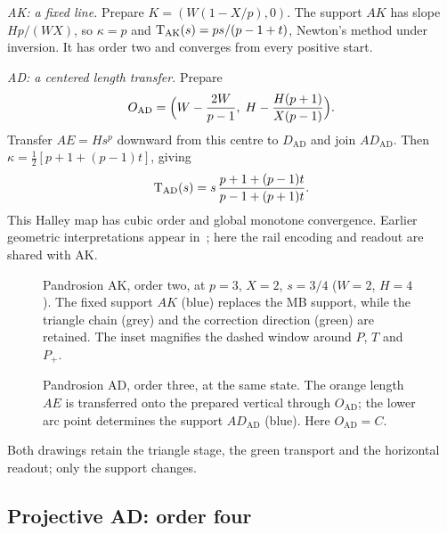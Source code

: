 \emph{AK: a fixed line.} Prepare $K=(W(1-X/p),0)$. The support $AK$ has slope $Hp/(WX)$, so
$\kappa=p$ and $\mathrm{T}_{\mathrm{AK}}(s)=ps/(p-1+t)$, Newton's method under inversion. It has order two and
converges from every positive start.

\emph{AD: a centered length transfer.} Prepare
\[ O_{\mathrm{AD}}=\Bigl(W-\frac{2W}{p-1},\;H-\frac{H(p+1)}{X(p-1)}\Bigr). \]
Transfer $AE=Hs^{p}$ downward from this centre to $D_{\mathrm{AD}}$ and join $AD_{\mathrm{AD}}$. Then
$\kappa=\tfrac12[p+1+(p-1)t]$, giving
\begin{equation}\label{eq:AD}
\mathrm{T}_{\mathrm{AD}}(s)=s\,\frac{p+1+(p-1)t}{p-1+(p+1)t}.
\end{equation}
This Halley map has cubic order and global monotone convergence. Earlier geometric interpretations
appear in~\cite{gander,scavo}; here the rail encoding and readout are shared with AK.

\begin{figure}[h]
\centering\figAK
\caption{Pandrosion AK, order two, at $p=3$, $X=2$, $s=3/4$ ($W=2$, $H=4$). The fixed support $AK$
(blue) replaces the MB support, while the triangle chain (grey) and the correction direction (green)
are retained. The inset magnifies the dashed window around $P$, $T$ and $P_+$.}\label{fig:ak}
\end{figure}

\begin{figure}[h]
\centering\figAD
\caption{Pandrosion AD, order three, at the same state. The orange length $AE$ is transferred onto the
prepared vertical through $O_{\mathrm{AD}}$; the lower arc point determines the support
$AD_{\mathrm{AD}}$ (blue). Here $O_{\mathrm{AD}}=C$.}\label{fig:ad}
\end{figure}

Both drawings retain the triangle stage, the green transport and the horizontal readout; only the
support changes.

\subsection{Projective AD: order four}

